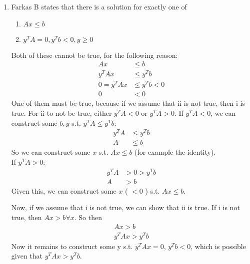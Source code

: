 \documentclass[a4paper]{article}
\begin{document}
\begin{enumerate}
\begin{enumerate}
		\item Farkas B states that there is a solution for exactly one of
			\begin{enumerate}
				\item $Ax \leq b$
				\item $y^TA=0, y^Tb<0, y \geq 0$
			\end{enumerate}
			Both of these cannot be true, for the following reason:
			\begin{align}
				Ax &\leq b \\
				y^TAx &\leq y^Tb \\
				0 = y^TAx &\leq y^Tb <0 \\
				0 &< 0
			\end{align}
			One of them must be true, because if we assume that ii is not true, then i is true.  For ii to not be true, either $y^TA < 0$ or $y^TA > 0$.  If $y^TA < 0$, we can construct some $b, y$ s.t. $y^TA \leq y^Tb$:
			\begin{align}
				y^TA &\leq y^Tb \\
				A &\leq b
			\end{align}
			So we can construct some $x$ s.t. $Ax \leq b$ (for example the identity). \\
			If $y^TA > 0$:
			\begin{align}
				y^TA &> 0 > y^Tb \\
				A &> b
			\end{align}
			Given this, we can construct some $x$ ( $< 0$ ) s.t. $Ax \leq b$.

			Now, if we assume that i is not true, we can show that ii is true.  If i is not true, then $Ax > b \forall x$.  So then
			\begin{align}
				Ax > b\\
				y^TAx > y^Tb
			\end{align}
			Now it remains to construct some y s.t. $y^TAx = 0$, $y^Tb < 0$, which is possible given that $y^TAx > y^Tb$.
	\end{enumerate}


\end{enumerate}
\end{document}
